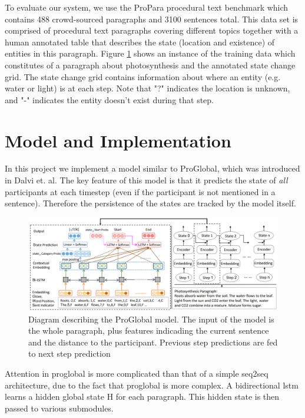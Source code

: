 \documentclass[11pt,a4paper]{article}
\begin{document}
To evaluate our system, we use the ProPara procedural text benchmark 
which contains 488 crowd-sourced paragraphs and 3100 sentences total. 
This data set is comprised of procedural text paragraphs covering different 
topics together with a human annotated table that describes the state 
(location and existence) of entities in this paragraph. Figure 
\ref{fig:participant-grid} shows an instance of the training data which 
constitutes of a paragraph about photosynthesis and the annotated state 
change grid. The state change grid contains information about where an 
entity (e.g. water or light) is at each step. Note that "?" indicates the 
location is unknown, and "-" indicates the entity doesn't exist during that step.

\section{Model and Implementation}

In this project we implement a model similar to ProGlobal, which was 
introduced in Dalvi et. al. The key feature of this model is that it predicts 
the state of \textit{all} participants at each timestep (even if the participant is 
not mentioned in a sentence). Therefore the persistence of the states are 
tracked by the model itself. 

\begin{figure}[h]
\includegraphics[width=\linewidth]{proglobal.PNG}
\caption{Diagram describing the ProGlobal model. The input of the model is the whole paragraph, plus features indicading the current sentence and the distance to the participant. Previous step predictions are fed to next step prediction}
\label{fig:participant-grid}
\end{figure}

Attention in proglobal is more complicated than that of a simple seq2seq architecture, due to the fact that proglobal is more complex. A bidirectional lstm learns a hidden global state H for each paragraph. This hidden state is then passed to various submodules.
\end{document}
